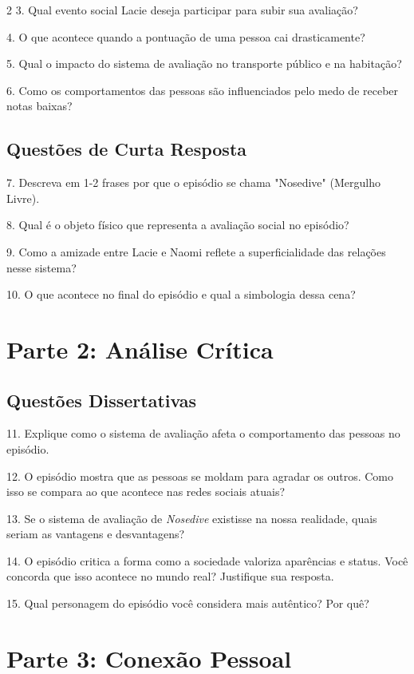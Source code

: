 \documentclass[11pt]{article}
\begin{document}
\begin{multicols}{2}
3. Qual evento social Lacie deseja participar para subir sua avaliação?  

4. O que acontece quando a pontuação de uma pessoa cai drasticamente?  

5. Qual o impacto do sistema de avaliação no transporte público e na habitação?  

6. Como os comportamentos das pessoas são influenciados pelo medo de receber notas baixas?  
\subsection*{Questões de Curta Resposta}

7. Descreva em 1-2 frases por que o episódio se chama "Nosedive" (Mergulho Livre).  

8. Qual é o objeto físico que representa a avaliação social no episódio?  

9. Como a amizade entre Lacie e Naomi reflete a superficialidade das relações nesse sistema?  

10. O que acontece no final do episódio e qual a simbologia dessa cena?  

\section*{Parte 2: Análise Crítica}
\subsection*{Questões Dissertativas}

\hspace{0.6cm}11. Explique como o sistema de avaliação afeta o comportamento das pessoas no episódio.  

12. O episódio mostra que as pessoas se moldam para agradar os outros. Como isso se compara ao que acontece nas redes sociais atuais?  

13. Se o sistema de avaliação de \textit{Nosedive} existisse na nossa realidade, quais seriam as vantagens e desvantagens?  

14. O episódio critica a forma como a sociedade valoriza aparências e status. Você concorda que isso acontece no mundo real? Justifique sua resposta.  

15. Qual personagem do episódio você considera mais autêntico? Por quê?  

\section*{Parte 3: Conexão Pessoal}


\end{multicols}
\end{document}
